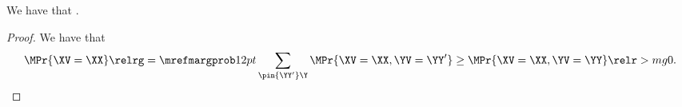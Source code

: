 \begin{proposition}
  We have that \marggimplprop.%
\end{proposition}

\begin{proof}
  We have that
  $$\MPr{\XV = \XX} \relrg = {\mrefmargprob} 12pt \sum_{\pin{\YY'}\Y} \MPr{\XV = \XX, \YV = \YY'} \ge \MPr{\XV = \XX, \YV = \YY} \relr > mg 0.$$%
\end{proof}
